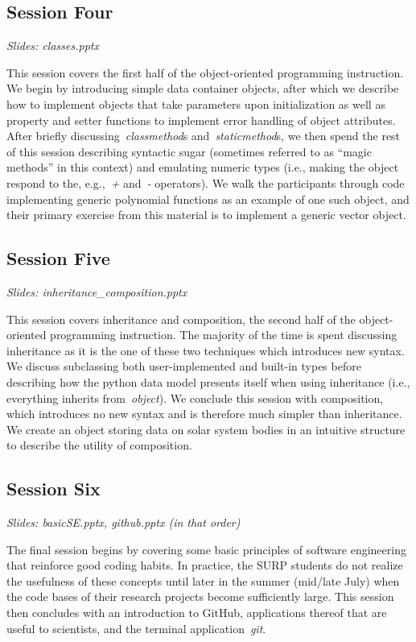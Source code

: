 \subsection{Session Four}
\label{sec:curriculum:four}
\noindent
\textit{Slides: classes.pptx}
\par\noindent
This session covers the first half of the object-oriented programming
instruction.
We begin by introducing simple data container objects, after which we describe
how to implement objects that take parameters upon initialization as well as
property and setter functions to implement error handling of object attributes.
After briefly discussing~\textit{classmethod}s and~\textit{staticmethod}s, we
then spend the rest of this session describing syntactic sugar (sometimes
referred to as ``magic methods'' in this context) and emulating numeric types
(i.e., making the object respond to the, e.g.,~\textit{+} and~\textit{-}
operators).
We walk the participants through code implementing generic polynomial functions
as an example of one such object, and their primary exercise from this material
is to implement a generic vector object.

\subsection{Session Five}
\label{sec:curriculum:five}
\noindent
\textit{Slides: inheritance\_composition.pptx}
\par\noindent
This session covers inheritance and composition, the second half of the
object-oriented programming instruction.
The majority of the time is spent discussing inheritance as it is the one of
these two techniques which introduces new syntax.
We discuss subclassing both user-implemented and built-in types before
describing how the python data model presents itself when using inheritance
(i.e., everything inherits from~\textit{object}).
We conclude this session with composition, which introduces no new syntax and
is therefore much simpler than inheritance.
We create an object storing data on solar system bodies in an intuitive
structure to describe the utility of composition.

\subsection{Session Six}
\label{sec:curriculum:six}
\noindent
\textit{Slides: basicSE.pptx, github.pptx (in that order)}
\par\noindent
The final session begins by covering some basic principles of software
engineering that reinforce good coding habits.
In practice, the SURP students do not realize the usefulness of these concepts
until later in the summer (mid/late July) when the code bases of their research
projects become sufficiently large.
This session then concludes with an introduction to GitHub, applications
thereof that are useful to scientists, and the terminal
application~\textit{git}.

